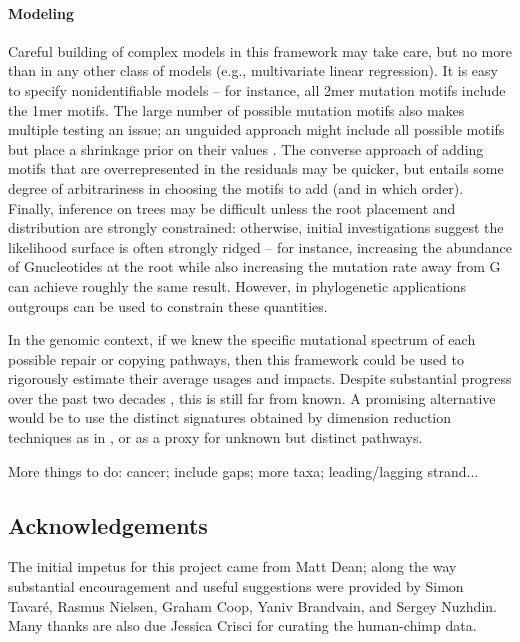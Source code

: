 \documentclass{article}
\newcommand{\nG}{\mbox{G}}
\theoremstyle{plain}
\theoremstyle{definition}
\begin{document}
\paragraph{Modeling}
Careful building of complex models in this framework may take care,
but no more than in any other class of models (e.g., multivariate linear regression).
It is easy to specify nonidentifiable models --
for instance, all 2mer mutation motifs include the 1mer motifs.
The large number of possible mutation motifs also makes multiple testing an issue;
an unguided approach might include all possible motifs but place a shrinkage prior on their values \citep{bhadra2015horseshoe}.
The converse approach of adding motifs that are overrepresented in the residuals
may be quicker, but entails some degree of arbitrariness in choosing the motifs to add (and in which order).
Finally, inference on trees may be difficult unless the root placement and distribution are strongly constrained:
otherwise, initial investigations suggest the likelihood surface is often strongly ridged --
for instance, increasing the abundance of \nG nucleotides at the root while also increasing the mutation rate away from \nG
can achieve roughly the same result.
However, in phylogenetic applications outgroups can be used to constrain these quantities.

In the genomic context,
if we knew the specific mutational spectrum of each possible repair or copying pathways,
then this framework could be used to rigorously estimate their average usages and impacts.
Despite substantial progress over the past two decades \citep{goodman2013translesion,sale2012yfamily},
this is still far from known.
A promising alternative would be to use the distinct signatures obtained by dimension reduction techniques as in
\citet{alexandrov2013signatures}, \citep{mathieson2017differences} or \citep{shiraishi2015simple} as a proxy for unknown but distinct pathways.

More things to do: cancer; include gaps; more taxa; leading/lagging strand...


\subsection{Acknowledgements}
The initial impetus for this project came from Matt Dean;
along the way substantial encouragement and useful suggestions were provided by
Simon Tavar\'e, Rasmus Nielsen, Graham Coop, Yaniv Brandvain, and Sergey Nuzhdin.
Many thanks are also due Jessica Crisci for curating the human-chimp data.
\end{document}
